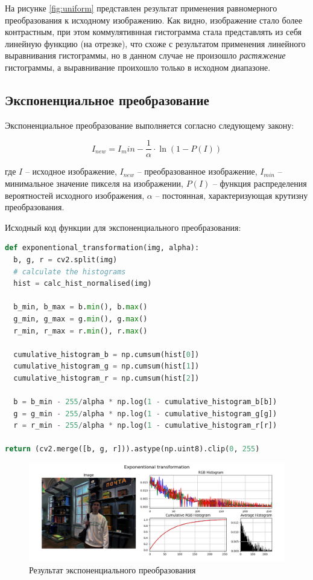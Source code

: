 На рисунке \ref{fig:uniform} представлен результат применения равномерного преобразования к исходному изображению. 
Как видно, изображение стало более контрастным, при этом коммулятивнная гистограмма стала представлять из себя
линейную функцию (на отрезке), что схоже с результатом применения линейного выравнивания гистограммы, но 
в данном случае не произошло \textit{растяжение} гистограммы, а выравнивание проихошло только в исходном диапазоне. 


\subsection{Экспоненциальное преобразование}

Экспоненциальное преобразование выполняется согласно следующему закону:

\begin{equation}
  I_{new} = I_min - \frac{1}{\alpha} \cdot \ln(1 - P(I))
\end{equation}

где $I$ -- исходное изображение, $I_{new}$ -- преобразованное изображение, $I_{min}$ -- минимальное значение пикселя на изображении, $P(I)$ -- функция распределения вероятностей исходного изображения, $\alpha$ -- постоянная, характеризующая крутизну преобразования. 

Исходный код функции для экспоненциального преобразования:

\begin{lstlisting}[language=Python]
def exponentional_transformation(img, alpha):
  b, g, r = cv2.split(img)
  # calculate the histograms
  hist = calc_hist_normalised(img)

  b_min, b_max = b.min(), b.max()
  g_min, g_max = g.min(), g.max()
  r_min, r_max = r.min(), r.max()

  cumulative_histogram_b = np.cumsum(hist[0]) 
  cumulative_histogram_g = np.cumsum(hist[1])
  cumulative_histogram_r = np.cumsum(hist[2])

  b = b_min - 255/alpha * np.log(1 - cumulative_histogram_b[b]) 
  g = g_min - 255/alpha * np.log(1 - cumulative_histogram_g[g]) 
  r = r_min - 255/alpha * np.log(1 - cumulative_histogram_r[r]) 

return (cv2.merge([b, g, r])).astype(np.uint8).clip(0, 255)
\end{lstlisting}

\begin{figure}[H]
    \centering
    \includegraphics[width=\textwidth]{../results/Exponentional transformation.png}
    \caption{Результат экспоненциального преобразования}
    \label{fig:exponentional}
\end{figure}

